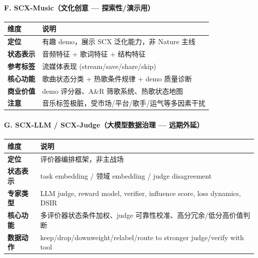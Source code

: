 \documentclass[
  12pt,
]{ctexart}
\begin{document}
\paragraph{F. SCX-Music（文化创意 ---
探索性/演示用）}\label{f.-scx-musicux6587ux5316ux521bux610f-ux63a2ux7d22ux6027ux6f14ux793aux7528}

\begin{longtable}[]{@{}ll@{}}
\toprule\noalign{}
维度 & 说明 \\
\midrule\noalign{}
\endhead
\bottomrule\noalign{}
\endlastfoot
\textbf{定位} & 有趣 demo，展示 SCX 泛化能力，非 Nature 主线 \\
\textbf{状态表示} & 音频特征 + 歌词特征 + 结构特征 \\
\textbf{参考标签} & 流媒体表现 (stream/save/share/skip) \\
\textbf{核心功能} & 歌曲状态分类 + 热歌条件规律 + demo 质量诊断 \\
\textbf{商业价值} & demo 评分器、A\&R 筛歌系统、热歌状态地图 \\
\textbf{注意} & 音乐标签极脏，受市场/平台/歌手/运气等多因素干扰 \\
\end{longtable}

\paragraph{G. SCX-LLM / SCX-Judge（大模型数据治理 ---
远期外延）}\label{g.-scx-llm-scx-judgeux5927ux6a21ux578bux6570ux636eux6cbbux7406-ux8fdcux671fux5916ux5ef6}

\begin{longtable}[]{@{}
  >{\raggedright\arraybackslash}p{}
  >{\raggedright\arraybackslash}p{}@{}}
\toprule\noalign{}
\begin{minipage}[b]{\linewidth}\raggedright
维度
\end{minipage} & \begin{minipage}[b]{\linewidth}\raggedright
说明
\end{minipage} \\
\midrule\noalign{}
\endhead
\bottomrule\noalign{}
\endlastfoot
\textbf{定位} & 评价器编排框架，非主战场 \\
\textbf{状态表示} & task embedding / 领域 embedding / judge
disagreement \\
\textbf{专家类型} & LLM judge, reward model, verifier, influence score,
loss dynamics, DSIR \\
\textbf{核心功能} & 多评价器状态条件加权、judge
可靠性校准、高分冗余/低分高价值判断 \\
\textbf{数据动作} & keep/drop/downweight/relabel/route to stronger
judge/verify with tool \\
\end{longtable}
\end{document}
